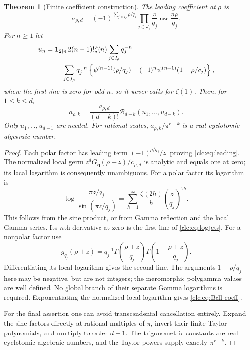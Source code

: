 \documentclass[11pt,a4paper]{article}
\numberwithin{equation}{section}
\newtheorem{theorem}{Theorem}[section]
\theoremstyle{definition}\newtheorem{definition}[theorem]{Definition}
\theoremstyle{remark}\newtheorem{remark}[theorem]{Remark}
\newcommand{\bq}{\boldsymbol q}\newcommand{\bs}{\boldsymbol s}
\begin{document}
\begin{theorem}[Finite coefficient construction]\label{clc:thm:coeff}
The leading coefficient at $\rho$ is
\begin{equation}\label{clc:eq:leading}
 a_{\rho,d}=(-1)^{\sum_{j\in I_\rho}\rho/q_j}
 \prod_{j\in J_\rho}\frac{\pi}{q_j}\csc\frac{\pi\rho}{q_j}.
\end{equation}
For $n\ge1$ let
\begin{align}
 u_n={}&\boldsymbol1_{2\mid n}\,2(n-1)!\zeta(n)
              \sum_{j\in I_\rho}q_j^{-n}\notag\\
 &+\sum_{j\in J_\rho}q_j^{-n}
 \left\{\psi^{(n-1)}(\rho/q_j)
       +(-1)^n\psi^{(n-1)}(1-\rho/q_j)\right\},
 \label{clc:eq:logjets}
\end{align}
where the first line is zero for odd $n$, so it never calls for
$\zeta(1)$. Then, for $1\le k\le d$,
\begin{equation}\label{clc:eq:Bell-coeff}
 a_{\rho,k}=\frac{a_{\rho,d}}{(d-k)!}
                  \mathcal B_{d-k}(u_1,\ldots,u_{d-k}).
\end{equation}
Only $u_1,\ldots,u_{d-1}$ are needed. For rational scales,
$a_{\rho,k}/\pi^{r-k}$ is a real cyclotomic algebraic number.
\end{theorem}
\begin{proof}
Each polar factor has leading term
$(-1)^{\rho/q_j}/z$, proving \eqref{clc:eq:leading}.
The normalized local germ
$z^dG_{\bq}(\rho+z)/a_{\rho,d}$ is analytic and equals one at zero;
its local logarithm is consequently unambiguous.
For a polar factor its logarithm is
\[
 \log\frac{\pi z/q_j}{\sin(\pi z/q_j)}
 =\sum_{h=1}^\infty\frac{\zeta(2h)}{h}\left(\frac z{q_j}\right)^{2h}.
\]
This follows from the sine product, or from Gamma reflection and the
local Gamma series. Its $n$th derivative at zero is the first line of
\eqref{clc:eq:logjets}.
For a nonpolar factor use
\[
 g_{q_j}(\rho+z)=q_j^{-1}
 \Gamma\left(\frac{\rho+z}{q_j}\right)
 \Gamma\left(1-\frac{\rho+z}{q_j}\right).
\]
Differentiating its local logarithm gives the second line. The arguments
$1-\rho/q_j$ here may be negative, but are not integers; the meromorphic
polygamma values are well defined. No global branch of their separate
Gamma logarithms is required. Exponentiating the normalized local
logarithm gives \eqref{clc:eq:Bell-coeff}.

For the final assertion one can avoid transcendental cancellation
entirely. Expand the sine factors directly at rational multiples of
$\pi$, invert their finite Taylor polynomials, and multiply to order
$d-1$. The trigonometric constants are real cyclotomic algebraic
numbers, and the Taylor powers supply exactly $\pi^{r-k}$.
\end{proof}
\end{document}
